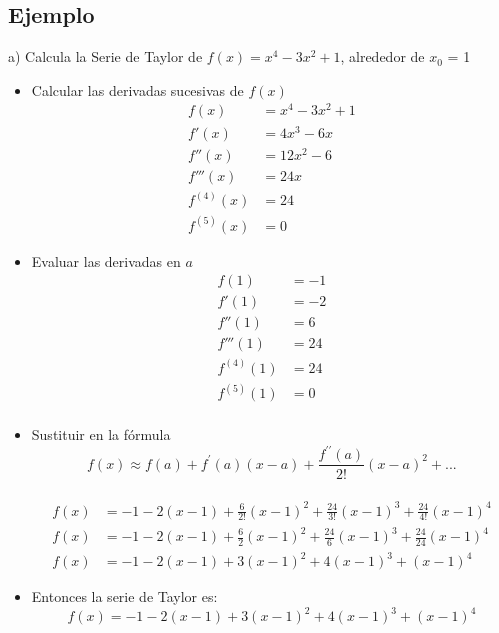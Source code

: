 \documentclass[12pt, a4paper, oneside]{article}
\begin{document}
\subsection{Ejemplo}
a) Calcula la Serie de Taylor de $f(x)=x^4-3x^2+1$, alrededor de $x_0$ = 1
\begin{itemize}
	\item Calcular las derivadas sucesivas de $f(x)$
	      \begingroup
	      \Large
	      \begin{align*}
		      f(x)       & = x^4 - 3x^2 + 1 \\
		      f'(x)      & = 4x^3-6x        \\
		      f''(x)     & = 12x^2-6        \\
		      f'''(x)    & = 24x            \\
		      f^{(4)}(x) & = 24             \\
		      f^{(5)}(x) & = 0
	      \end{align*}
	      \endgroup

	\item Evaluar las derivadas en $a$
	      \begingroup
	      \Large
	      \begin{align*}
		      f(1)       & = -1 \\
		      f'(1)      & = -2 \\
		      f''(1)     & = 6  \\
		      f'''(1)    & = 24 \\
		      f^{(4)}(1) & = 24 \\
		      f^{(5)}(1) & = 0  \\
	      \end{align*}
	      \endgroup

	\item Sustituir en la fórmula
	      \begingroup
	      \Large
	      \begin{equation*}
		      f(x) \approx f(a) + f^\prime(a)(x-a) + \frac{f^{\prime\prime}(a)}{2!}(x-a)^2 + ...
	      \end{equation*}\\
	      \large
	      \begin{align*}
		      f(x) & = -1-2(x-1) + \frac{6}{2!}(x-1)^2 +\frac{24}{3!}(x-1)^3+
		      \frac{24}{4!}(x-1)^4                                                             \\
		      f(x) & = -1-2(x-1)+\frac{6}{2}(x-1)^2 +\frac{24}{6}(x-1)^3+ \frac{24}{24}(x-1)^4 \\
		      f(x) & = -1-2(x-1)+3(x-1)^2+4(x-1)^3+(x-1)^4
	      \end{align*}
	      \endgroup

	\item Entonces la serie de Taylor es:
	      \begingroup
	      \Large
	      \begin{equation*}
		      f(x) = -1-2(x-1)+3(x-1)^2+4(x-1)^3+(x-1)^4
	      \end{equation*}
	      \endgroup
\end{itemize}
\end{document}
